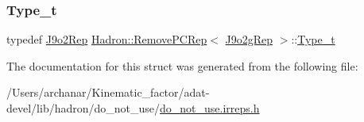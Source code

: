\mbox{\label{structHadron_1_1RemovePCRep_3_01J9o2gRep_01_4_ae7806eeb69b1c9624bc8e9aec21d9346}} 
\subsubsection{\texorpdfstring{Type\_t}{Type\_t}\hspace{0.1cm}{\footnotesize\ttfamily [2/2]}}
{\footnotesize\ttfamily typedef \mbox{\hyperlink{structHadron_1_1J9o2Rep}{J9o2\+Rep}} \mbox{\hyperlink{structHadron_1_1RemovePCRep}{Hadron\+::\+Remove\+P\+C\+Rep}}$<$ \mbox{\hyperlink{structHadron_1_1J9o2gRep}{J9o2g\+Rep}} $>$\+::\mbox{\hyperlink{structHadron_1_1RemovePCRep_3_01J9o2gRep_01_4_ae7806eeb69b1c9624bc8e9aec21d9346}{Type\+\_\+t}}}



The documentation for this struct was generated from the following file\+:\begin{DoxyCompactItemize}
\item 
/\+Users/archanar/\+Kinematic\+\_\+factor/adat-\/devel/lib/hadron/do\+\_\+not\+\_\+use/\mbox{\hyperlink{adat-devel_2lib_2hadron_2do__not__use_2do__not__use_8irreps_8h}{do\+\_\+not\+\_\+use.\+irreps.\+h}}\end{DoxyCompactItemize}

